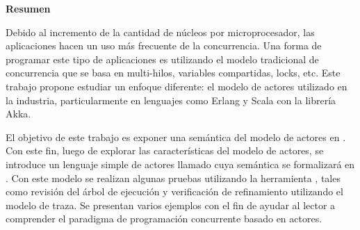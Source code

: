 \begin{center}
\begin{LARGE}\textbf{Resumen}\end{LARGE}
\end{center}

\noindent
Debido al incremento de la cantidad de núcleos por microprocesador, las aplicaciones hacen un uso más frecuente de la concurrencia. Una forma de programar este tipo de aplicaciones es utilizando el modelo tradicional de concurrencia que se basa en multi-hilos, variables compartidas, locks, etc. Este trabajo propone estudiar un enfoque diferente: el modelo de actores utilizado en la industria, particularmente en lenguajes como Erlang y Scala con la librería Akka. 

\noindent
El objetivo de este trabajo es exponer una semántica del modelo de actores en \CSP. Con este fin, luego de explorar las características del modelo de actores, se introduce un lenguaje simple de actores llamado \SAL cuya semántica se formalizará en \CSP. Con este modelo se realizan algunas pruebas utilizando la herramienta \FDR, tales como revisión del árbol de ejecución y verificación de refinamiento utilizando el modelo de traza. Se presentan varios ejemplos con el fin de ayudar al lector a comprender el paradigma de programación concurrente basado en actores.